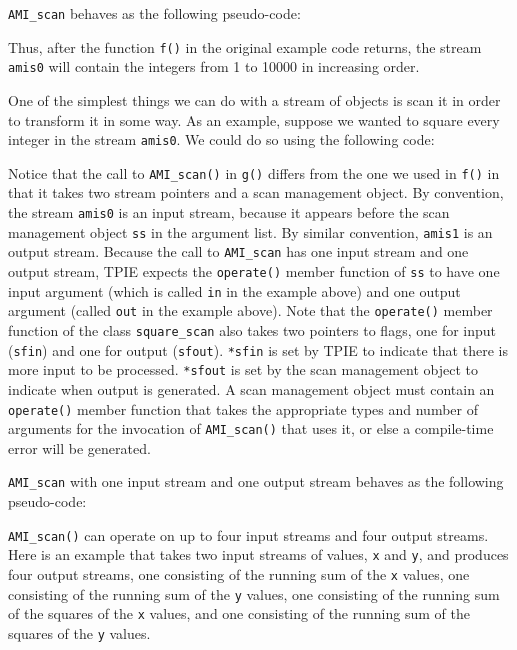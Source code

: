 \lstinline|AMI_scan| behaves as the following pseudo-code:



Thus, after the function \lstinline|f()| in the original example code
returns, the stream \lstinline|amis0| will contain the integers from 1
to 10000 in increasing order.

One of the simplest things we can do with a stream of objects is scan
it in order to transform it in some way.  As an example, suppose we
wanted to square every integer in the stream \lstinline|amis0|.  We
could do so using the following code:



Notice that the call to \lstinline|AMI_scan()| in \lstinline|g()|
differs from the one we used in \lstinline|f()| in that it takes two
stream pointers and a scan management object.  By convention, the
stream \lstinline|amis0| is an input stream, because it appears before
the scan management object \lstinline|ss| in the argument list.  By
similar convention, \lstinline|amis1| is an output stream.  Because
the call to \lstinline|AMI_scan| has one input stream and one output
stream, TPIE expects the \lstinline|operate()| member function of
\lstinline|ss| to have one input argument (which is called
\lstinline|in| in the example above) and one output argument (called
\lstinline|out| in the example above).  Note that the
\lstinline|operate()| member function of the class
\lstinline|square_scan| also takes two pointers to flags, one for
input (\lstinline|sfin|) and one for output (\lstinline|sfout|).
\lstinline|*sfin| is set by TPIE to indicate that there is more input
to be processed.  \lstinline|*sfout| is set by the scan management
object to indicate when output is generated.  A scan management object
must contain an \lstinline|operate()| member function that takes the
appropriate types and number of arguments for the invocation of
\lstinline|AMI_scan()| that uses it, or else a compile-time error will
be generated.

\lstinline|AMI_scan| with one input stream and one output stream
behaves as the following pseudo-code:



\lstinline|AMI_scan()| can operate on up to four input streams and
four output streams.  Here is an example that takes two input streams
of values, \lstinline|x| and \lstinline|y|, and produces four output
streams, one consisting of the running sum of the \lstinline|x|
values, one consisting of the running sum of the \lstinline|y| values,
one consisting of the running sum of the squares of the \lstinline|x|
values, and one consisting of the running sum of the squares of the
\lstinline|y| values.

